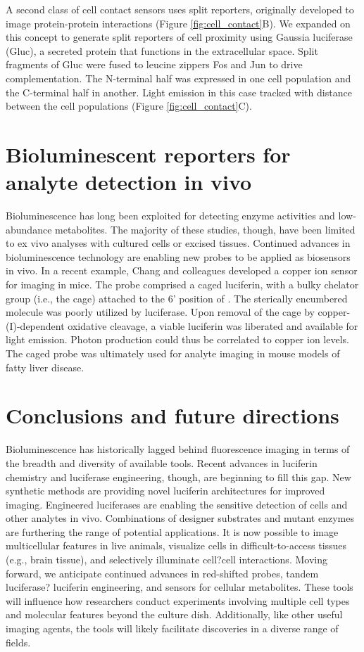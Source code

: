 A second class of cell contact sensors uses split reporters,
originally developed to image protein-protein interactions
(Figure \ref{fig:cell_contact}B). We expanded on this concept to generate split
reporters of cell proximity using Gaussia luciferase (Gluc), a
secreted protein that functions in the extracellular space. Split
fragments of Gluc were fused to leucine zippers Fos and Jun to
drive complementation. The N-terminal half was expressed in
one cell population and the C-terminal half in another. Light
emission in this case tracked with distance between the cell
populations (Figure \ref{fig:cell_contact}C).
\section{Bioluminescent reporters for analyte detection in vivo}
Bioluminescence has long been exploited for detecting enzyme
activities and low-abundance metabolites. The majority of these
studies, though, have been limited to ex vivo analyses with
cultured cells or excised tissues. Continued advances in
bioluminescence technology are enabling new probes to be
applied as biosensors in vivo.\cite{Heffern:2016hc,Sekar:2016iu} In a recent example, Chang
and colleagues developed a copper ion sensor for imaging in
mice. The probe comprised a caged luciferin, with a bulky
chelator group (i.e., the cage) attached to the 6' position of \dluciferin{}.
The sterically encumbered molecule was poorly
utilized by luciferase. Upon removal of the cage by copper-
(I)-dependent oxidative cleavage, a viable luciferin was liberated
and available for light emission. Photon production could thus
be correlated to copper ion levels. The caged probe was
ultimately used for analyte imaging in mouse models of fatty
liver disease.\cite{Heffern:2016hc}
\section{Conclusions and future directions}
Bioluminescence has historically lagged behind fluorescence
imaging in terms of the breadth and diversity of available tools.
Recent advances in luciferin chemistry and luciferase engineering,
though, are beginning to fill this gap. New synthetic
methods are providing novel luciferin architectures for
improved imaging. Engineered luciferases are enabling the
sensitive detection of cells and other analytes in vivo.
Combinations of designer substrates and mutant enzymes are
furthering the range of potential applications. It is now possible
to image multicellular features in live animals, visualize cells in
difficult-to-access tissues (e.g., brain tissue), and selectively
illuminate cell?cell interactions. Moving forward, we anticipate
continued advances in red-shifted probes, tandem luciferase?
luciferin engineering, and sensors for cellular metabolites.
These tools will influence how researchers conduct experiments
involving multiple cell types and molecular features beyond the
culture dish. Additionally, like other useful imaging agents, the
tools will likely facilitate discoveries in a diverse range of fields.

